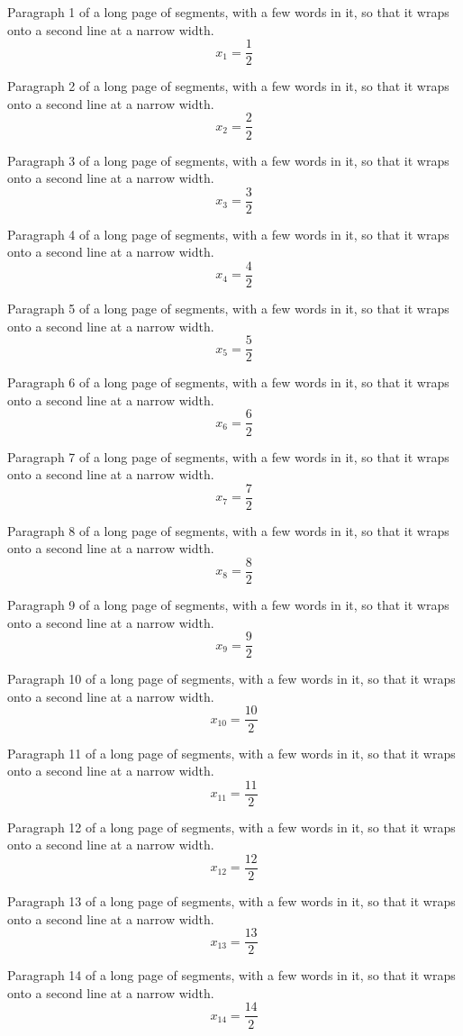 Paragraph 1 of a long page of segments, with a few words in it, so that it wraps onto a second line at a narrow width.
\[ x_{1} = \frac{1}{2} \]

Paragraph 2 of a long page of segments, with a few words in it, so that it wraps onto a second line at a narrow width.
\[ x_{2} = \frac{2}{2} \]

Paragraph 3 of a long page of segments, with a few words in it, so that it wraps onto a second line at a narrow width.
\[ x_{3} = \frac{3}{2} \]

Paragraph 4 of a long page of segments, with a few words in it, so that it wraps onto a second line at a narrow width.
\[ x_{4} = \frac{4}{2} \]

Paragraph 5 of a long page of segments, with a few words in it, so that it wraps onto a second line at a narrow width.
\[ x_{5} = \frac{5}{2} \]

Paragraph 6 of a long page of segments, with a few words in it, so that it wraps onto a second line at a narrow width.
\[ x_{6} = \frac{6}{2} \]

Paragraph 7 of a long page of segments, with a few words in it, so that it wraps onto a second line at a narrow width.
\[ x_{7} = \frac{7}{2} \]

Paragraph 8 of a long page of segments, with a few words in it, so that it wraps onto a second line at a narrow width.
\[ x_{8} = \frac{8}{2} \]

Paragraph 9 of a long page of segments, with a few words in it, so that it wraps onto a second line at a narrow width.
\[ x_{9} = \frac{9}{2} \]

Paragraph 10 of a long page of segments, with a few words in it, so that it wraps onto a second line at a narrow width.
\[ x_{10} = \frac{10}{2} \]

Paragraph 11 of a long page of segments, with a few words in it, so that it wraps onto a second line at a narrow width.
\[ x_{11} = \frac{11}{2} \]

Paragraph 12 of a long page of segments, with a few words in it, so that it wraps onto a second line at a narrow width.
\[ x_{12} = \frac{12}{2} \]

Paragraph 13 of a long page of segments, with a few words in it, so that it wraps onto a second line at a narrow width.
\[ x_{13} = \frac{13}{2} \]

Paragraph 14 of a long page of segments, with a few words in it, so that it wraps onto a second line at a narrow width.
\[ x_{14} = \frac{14}{2} \]


